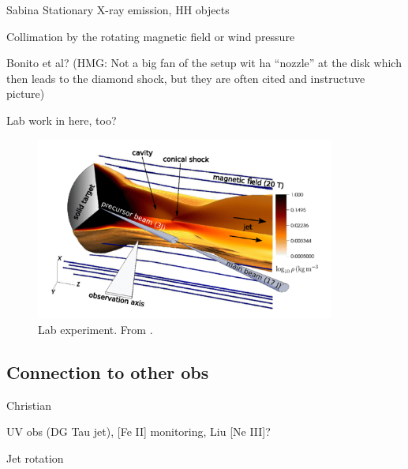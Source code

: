 {\color{blue}Sabina
Stationary X-ray emission, HH objects

Collimation by the rotating magnetic field or wind pressure

Bonito et al? (HMG: Not a big fan of the setup wit ha ``nozzle'' at the disk which then leads to the diamond shock, but they are often cited and instructuve picture)

Lab work in here, too?
}


\begin{figure}[t]
\centering

\includegraphics[height=6cm]{figs/lab}
\caption{Lab experiment. From \citet{PhysRevLett.119.255002}. \label{fig:lab}}
\end{figure}


\subsection{Connection to other obs}
{\color{blue}Christian

UV obs (DG Tau jet), [Fe II] monitoring, Liu [Ne III]?

Jet rotation

}
